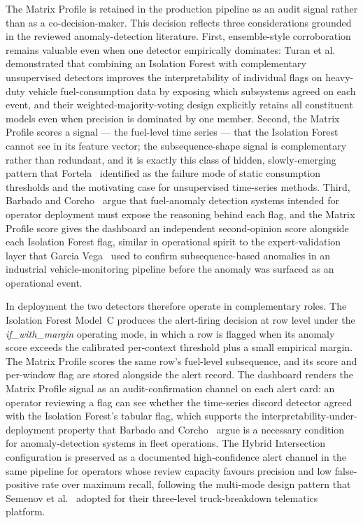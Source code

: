 The Matrix Profile is retained in the production pipeline as an audit signal rather than as a co-decision-maker. This decision reflects three considerations grounded in the reviewed anomaly-detection literature. First, ensemble-style corroboration remains valuable even when one detector empirically dominates: Turan et al.~\cite{turan2024detecting} demonstrated that combining an Isolation Forest with complementary unsupervised detectors improves the interpretability of individual flags on heavy-duty vehicle fuel-consumption data by exposing which subsystems agreed on each event, and their weighted-majority-voting design explicitly retains all constituent models even when precision is dominated by one member. Second, the Matrix Profile scores a signal --- the fuel-level time series --- that the Isolation Forest cannot see in its feature vector; the subsequence-shape signal is complementary rather than redundant, and it is exactly this class of hidden, slowly-emerging pattern that Fortela~\cite{fortela2023unsupervised} identified as the failure mode of static consumption thresholds and the motivating case for unsupervised time-series methods. Third, Barbado and Corcho~\cite{barbado2022interpretable} argue that fuel-anomaly detection systems intended for operator deployment must expose the reasoning behind each flag, and the Matrix Profile score gives the dashboard an independent second-opinion score alongside each Isolation Forest flag, similar in operational spirit to the expert-validation layer that Garcia Vega~\cite{garcia2022development} used to confirm subsequence-based anomalies in an industrial vehicle-monitoring pipeline before the anomaly was surfaced as an operational event.

In deployment the two detectors therefore operate in complementary roles. The Isolation Forest Model~C produces the alert-firing decision at row level under the \emph{if\_with\_margin} operating mode, in which a row is flagged when its anomaly score exceeds the calibrated per-context threshold plus a small empirical margin. The Matrix Profile scores the same row's fuel-level subsequence, and its score and per-window flag are stored alongside the alert record. The dashboard renders the Matrix Profile signal as an audit-confirmation channel on each alert card: an operator reviewing a flag can see whether the time-series discord detector agreed with the Isolation Forest's tabular flag, which supports the interpretability-under-deployment property that Barbado and Corcho~\cite{barbado2022interpretable} argue is a necessary condition for anomaly-detection systems in fleet operations. The Hybrid Intersection configuration is preserved as a documented high-confidence alert channel in the same pipeline for operators whose review capacity favours precision and low false-positive rate over maximum recall, following the multi-mode design pattern that Semenov et al.~\cite{semenov2024concept} adopted for their three-level truck-breakdown telematics platform.
\fi   %


